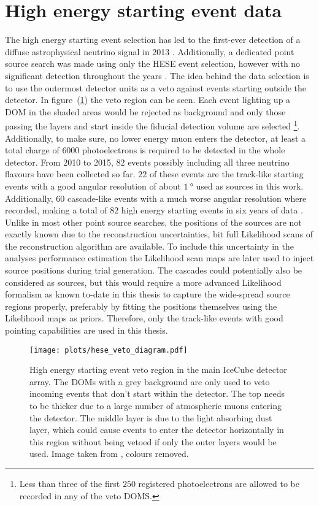 \section{High energy starting event data}
The high energy starting event selection has led to the first-ever detection of a diffuse astrophysical neutrino signal in 2013 .
Additionally, a dedicated point source search was made using only the HESE event selection, however with no significant detection throughout the years .
The idea behind the data selection is to use the outermost detector units as a veto against events starting outside the detector.
In figure~(\ref{fig:data_hese_veto}) the veto region can be seen.
Each event lighting up a DOM in the shaded areas would be rejected as background and only those passing the layers and start inside the fiducial detection volume are selected \footnote{Less than three of the first $\num{250}$ registered photoelectrons are allowed to be recorded in any of the veto DOMS. }.
Additionally, to make sure, no lower energy muon enters the detector, at least a total charge of $\num{6000}$ photoelectrons is required to be detected in the whole detector.
From 2010 to 2015, $\num{82}$ events possibly including all three neutrino flavours have been collected so far.
$\num{22}$ of these events are the track-like starting events with a good angular resolution of about $\SI{1}{\degree}$ used as sources in this work.
Additionally, $\num{60}$ cascade-like events with a much worse angular resolution where recorded, making a total of $\num{82}$ high energy starting events in six years of data .
Unlike in most other point source searches, the positions of the sources are not exactly known due to the reconstruction uncertainties, bit full Likelihood scans of the reconstruction algorithm are available.
To include this uncertainty in the analyses performance estimation the Likelihood scan maps are later used to inject source positions during trial generation.
The cascades could potentially also be considered as sources, but this would require a more advanced Likelihood formalism as known to-date in this thesis to capture the wide-spread source regions properly, preferably by fitting the positions themselves using the Likelihood maps as priors.
Therefore, only the track-like events with good pointing capabilities are used in this thesis.

\begin{figure}[htbp]
  \centering
  \texttt{[image: plots/hese\_veto\_diagram.pdf]}
  \caption{
    High energy starting event veto region in the main IceCube detector array.
    The  DOMs with a grey background are only used to veto incoming events that don't start within the detector.
    The top needs to be thicker due to a large number of atmospheric muons entering the detector.
    The middle layer is due to the light absorbing dust layer, which could cause events to enter the detector horizontally in this region without being vetoed if only the outer layers would be used.
    Image taken from , colours removed.
  }
  \label{fig:data_hese_veto}
\end{figure}

